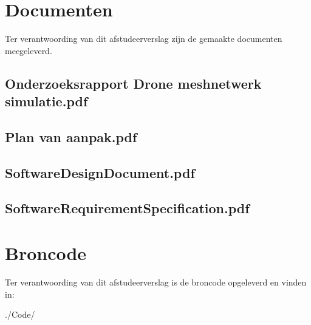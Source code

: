\documentclass[a4paper, 11pt, oneside]{report}
\begin{document}



\clearpage
\appendix
\chapter{Documenten}
Ter verantwoording van dit afstudeerverslag zijn de gemaakte documenten meegeleverd.
\section[Onderzoeksrapport Drone meshnetwerk simulatie]{Onderzoeksrapport Drone meshnetwerk simulatie.pdf}\label{sec:onderzoeksrapport-drone-meshnetwerk-simulatie}
\section[Plan van aanpak]{Plan van aanpak.pdf}\label{sec:bijlage:plan-van-aanpak}
\section[SoftwareDesignDocumen]{SoftwareDesignDocument.pdf}
\section[SoftwareRequirementSpecification]{SoftwareRequirementSpecification.pdf}\label{sec:softwarerequirementspecification}

\chapter{Broncode}\label{app:broncode}
Ter verantwoording van dit afstudeerverslag is de broncode opgeleverd en vinden in:

./Code/
\end{document}
